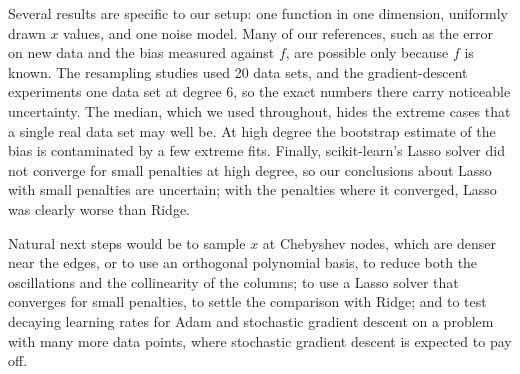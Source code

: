 Several results are specific to our setup: one function in one dimension, uniformly drawn $x$ values, and one noise model. Many of our references, such as the error on new data and the bias measured against $f$, are possible only because $f$ is known. The resampling studies used 20 data sets, and the gradient-descent experiments one data set at degree 6, so the exact numbers there carry noticeable uncertainty. The median, which we used throughout, hides the extreme cases that a single real data set may well be. At high degree the bootstrap estimate of the bias is contaminated by a few extreme fits. Finally, scikit-learn's Lasso solver did not converge for small penalties at high degree, so our conclusions about Lasso with small penalties are uncertain; with the penalties where it converged, Lasso was clearly worse than Ridge.

Natural next steps would be to sample $x$ at Chebyshev nodes, which are denser near the edges, or to use an orthogonal polynomial basis, to reduce both the oscillations and the collinearity of the columns; to use a Lasso solver that converges for small penalties, to settle the comparison with Ridge; and to test decaying learning rates for Adam and stochastic gradient descent on a problem with many more data points, where stochastic gradient descent is expected to pay off.
